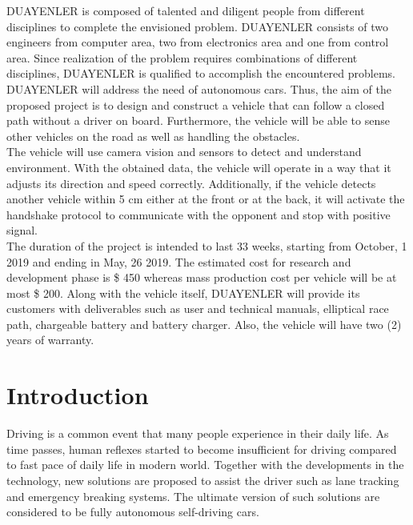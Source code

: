 \documentclass[a4paper,12pt]{article}
\begin{document}
	DUAYENLER is composed of talented and diligent people from different disciplines to complete the envisioned problem. DUAYENLER consists of two engineers from computer area, two from electronics area and one from control area. Since realization of the problem requires combinations of different disciplines, DUAYENLER is qualified to accomplish the encountered problems.\\
	
	DUAYENLER will address the need of autonomous cars. Thus, the aim of the proposed project is to design and construct a vehicle that can follow a closed path without a driver on board. Furthermore, the vehicle will be able to sense other vehicles on the road as well as handling the obstacles.\\
	
	The vehicle will use camera vision and sensors to detect and understand environment. With the obtained data, the vehicle will operate in a way that it adjusts its direction and speed correctly. Additionally, if the vehicle detects another vehicle within 5 cm either at the front or at the back, it will activate the handshake protocol to communicate with the opponent and stop with positive signal.\\
	
	The duration of the project is intended to last 33 weeks, starting from October, 1 2019 and ending in May, 26 2019. The estimated cost for research and development phase is  \$ 450 whereas mass production cost per vehicle will be at most \$ 200. Along with the vehicle itself, DUAYENLER will provide its customers with deliverables such as user and technical manuals, elliptical race path, chargeable battery and battery charger. Also, the vehicle will have two (2) years of warranty.
	

\section{Introduction}

	Driving is a common event that many people experience in their daily life. As time passes, human reflexes started to become insufficient for driving compared to fast pace of daily life in modern world. Together with the developments in the technology, new solutions are proposed to assist the driver such as lane tracking and emergency breaking systems. The ultimate version of such solutions are considered to be fully autonomous self-driving cars. \\
\end{document}
